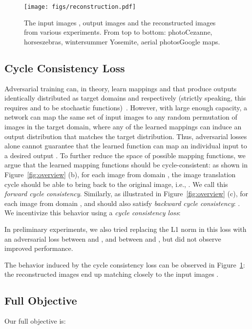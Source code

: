 \documentclass[10pt,twocolumn,letterpaper]{article}
\newcommand{\reffig}[1]{Figure~\ref{fig:#1}}
\newcommand{\lblfig}[1]{\label{fig:#1}}
\begin{document}
\begin{figure}[t]
\begin{center}
\texttt{[image: figs/reconstruction.pdf]}
\end{center}
 \vspace{-5 mm}
 \caption{The input images , output images  and the reconstructed images  from various experiments. From top to bottom: photoCezanne, horseszebras,  wintersummer Yosemite, aerial photosGoogle maps.}
  \vspace{-5 mm}
\lblfig{reconstruction}
\end{figure}

\subsection{Cycle Consistency Loss}
Adversarial training can, in theory, learn mappings  and  that produce outputs identically distributed as target domains  and  respectively (strictly speaking, this requires  and  to be stochastic functions)~\cite{goodfellow2016nips}. However, with large enough capacity, a network can map the same set of input images to any random permutation of images in the target domain, where any of the learned mappings can induce an output distribution that matches the target distribution. Thus, adversarial losses alone cannot guarantee that the learned function can map an individual input  to a desired output . To further reduce the space of possible mapping functions, we argue that the learned mapping functions should be cycle-consistent: as shown in \reffig{overview} (b), for each image  from domain , the image translation cycle should be able to bring  back to the original image, i.e., . We call this {\em forward cycle consistency}. Similarly, as illustrated in \reffig{overview} (c), for each image  from domain ,  and  should also satisfy {\em backward cycle consistency}: .
We incentivize this behavior using a \emph{cycle consistency loss}:

In preliminary experiments, we also tried replacing the L1 norm in this loss with an adversarial loss between  and , and between  and , but did not observe improved performance.

The behavior induced by the cycle consistency loss can be observed in \reffig{reconstruction}: the reconstructed images  end up matching closely to the input images .



\bigskip
\subsection{Full Objective}
Our full objective is:
\end{document}
